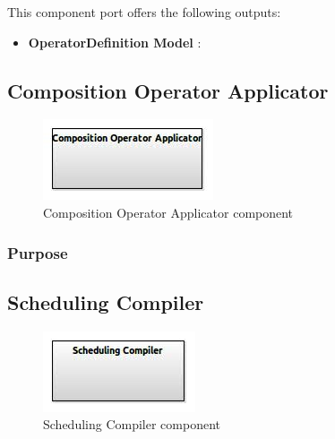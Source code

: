 \documentclass{gemoc} %
\begin{document}

This component port offers the following outputs:
\begin{itemize}
  \item \textbf{OperatorDefinition Model} :
\end{itemize}

\subsection{Composition Operator Applicator}

\begin{figure}[htp]
	\begin{center}
	\includegraphics*[trim=0.0cm 0.0cm 0cm 0.0cm, clip=true, scale=1.0]{../images/generated/Generated_Composition Operator Applicator.jpg}
	\caption{Composition Operator Applicator component}
	\end{center}
\end{figure}

\subsubsection{Purpose}



\subsection{Scheduling Compiler}

\begin{figure}[htp]
	\begin{center}
	\includegraphics*[trim=0.0cm 0.0cm 0cm 0.0cm, clip=true, scale=1.0]{../images/generated/Generated_Scheduling Compiler.jpg}
	\caption{Scheduling Compiler component}
	\end{center}
\end{figure}
\end{document}
